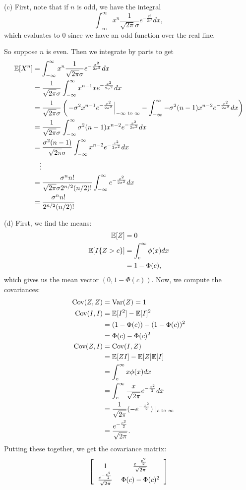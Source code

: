 (c) First, note that if $n$ is odd, we have the integral
\[
    \int_{-\infty}^\infty x^n \frac{1}{\sqrt{2\pi}\sigma}e^{-\frac{x^2}{2\sigma^2}} dx,
\]
which evaluates to 0 since we have an odd function over the real line.

So suppose $n$ is even. Then we integrate by parts to get
\begin{align*}
    \mathbb{E}[X^n] &= \int_{-\infty}^\infty x^n \frac{1}{\sqrt{2\pi}\sigma}e^{-\frac{x^2}{2\sigma^2}} dx \\
        &= \frac{1}{\sqrt{2\pi}\sigma} \int_{-\infty}^\infty x^{n - 1} xe^{-\frac{x^2}{2\sigma^2}} dx \\
        &= \frac{1}{\sqrt{2\pi}\sigma} \left(\left.-\sigma^2x^{n - 1}e^{-\frac{x^2}{2\sigma^2}}\right|_{-\infty \text{ to } \infty} - \int_{-\infty}^\infty -\sigma^2(n - 1)x^{n - 2}e^{-\frac{x^2}{2\sigma^2}} dx\right) \\
        &= \frac{1}{\sqrt{2\pi}\sigma}\int_{-\infty}^\infty \sigma^2(n - 1)x^{n - 2}e^{-\frac{x^2}{2\sigma^2}} dx \\
        &= \frac{\sigma^2(n - 1)}{\sqrt{2\pi}\sigma}\int_{-\infty}^\infty x^{n - 2}e^{-\frac{x^2}{2\sigma^2}} dx \\
        &\quad\vdots \\
        &= \frac{\sigma^n n!}{\sqrt{2\pi}\sigma 2^{n/2}(n/2)!} \int_{-\infty}^\infty e^{-\frac{x^2}{2\sigma^2}} dx \\
        &= \frac{\sigma^n n!}{2^{n/2}(n/2)!}
\end{align*}

(d) First, we find the means:
\begin{align*}
    \mathbb{E}[Z] &= 0 \\
    \mathbb{E}[I\{Z > c\}] &= \int_c^\infty \phi(x)dx \\
        &= 1 - \Phi(c),
\end{align*}
which gives us the mean vector $(0, 1 - \Phi(c))$. Now, we compute the covariances:
\begin{align*}
    \text{Cov}(Z, Z) &= \text{Var}(Z) = 1 \\
    \text{Cov}(I, I) &= \mathbb{E}[I^2] - \mathbb{E}[I]^2 \\
        &= (1 - \Phi(c)) - (1 - \Phi(c))^2 \\
        &= \Phi(c) - \Phi(c)^2 \\
    \text{Cov}(Z, I) &= \text{Cov}(I, Z) \\
        &= \mathbb{E}[ZI] - \mathbb{E}[Z]\mathbb{E}[I] \\
        &= \int_c^\infty x\phi(x) dx \\
        &= \int_c^\infty \frac{x}{\sqrt{2\pi}}e^{-\frac{x^2}{2}} dx \\
        &= \frac{1}{\sqrt{2\pi}}(-e^{-\frac{x^2}{2}})\mid_{c \text{ to } \infty} \\
        &= \frac{e^{-\frac{c^2}{2}}}{\sqrt{2\pi}}.
\end{align*}
Putting these together, we get the covariance matrix:
\[
\left[\begin{tabular}{cc}
    1 & $\frac{e^{-\frac{c^2}{2}}}{\sqrt{2\pi}}$ \\
    $\frac{e^{-\frac{c^2}{2}}}{\sqrt{2\pi}}$ & $\Phi(c) - \Phi(c)^2$
\end{tabular}\right]
\]

